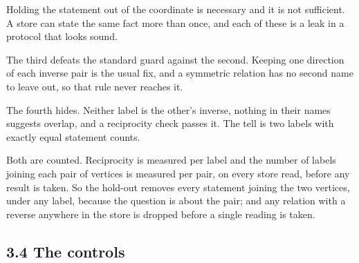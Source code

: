 \documentclass[10pt,letterpaper,twocolumn]{article}
\begin{document}
Holding the statement out of the coordinate is necessary and it is not sufficient. A store can state
the same fact more than once, and each of these is a leak in a protocol that looks sound.


The third defeats the standard guard against the second. Keeping one direction of each inverse pair
is the usual fix, and a symmetric relation has no second name to leave out, so that rule never
reaches it.

The fourth hides. Neither label is the other's inverse, nothing in their names suggests overlap, and
a reciprocity check passes it. The tell is two labels with exactly equal statement counts.

Both are counted. Reciprocity is measured per label and the number of labels joining each pair of
vertices is measured per pair, on every store read, before any result is taken. So the hold-out
removes every statement joining the two vertices, under any label, because the question is about the
pair; and any relation with a reverse anywhere in the store is dropped before a single reading is
taken.

\subsection{3.4 The controls}\label{34-the-controls}
\end{document}
